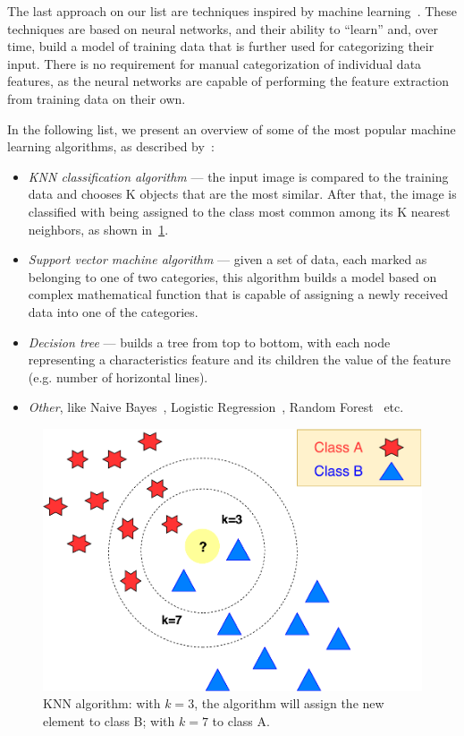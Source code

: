 The last approach on our list are techniques inspired by machine learning~\citep{sebastiani2002machine}. These techniques are based on neural networks, and their ability to ``learn'' and, over time, build a model of training data that is further used for categorizing their input. There is no requirement for manual categorization of individual data features, as the neural networks are capable of performing the feature extraction from training data on their own.

In the following list, we present an overview of some of the most popular machine learning algorithms, as described by~\citet{bhavsar2012comparative}:
\begin{itemize}
    \item \emph{KNN classification algorithm} --- the input image is compared to the training data and chooses K objects that are the most similar. After that, the image is classified with being assigned to the class most common among its K nearest neighbors, as shown in~\cref{fig:characterClassKNN}.
    \item \emph{Support vector machine algorithm} --- given a set of data, each marked as belonging to one of two categories, this algorithm builds a model based on complex mathematical function that is capable of assigning a newly received data into one of the categories.
    \item \emph{Decision tree} --- builds a tree from top to bottom, with each node representing a characteristics feature and its children the value of the feature (e.g. number of horizontal lines). 
    \item \emph{Other}, like Naive Bayes~\cite{ng2002discriminative}, Logistic Regression~\cite{ng2002discriminative}, Random Forest~\cite{segal2004machine} etc.
\end{itemize}

\begin{figure}[t]
\centering
\includegraphics[width=0.7\linewidth]{img/characterClassification/knn.pdf}
\caption{KNN algorithm: with $k=3$, the algorithm will assign the new element to class B; with $k=7$ to class A.} \label{fig:characterClassKNN}
\end{figure}

